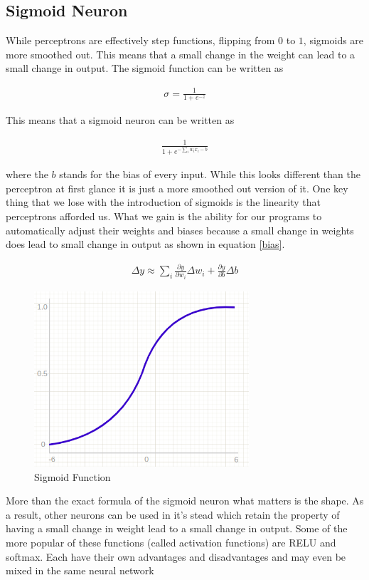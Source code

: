 \subsection{Sigmoid Neuron}

While perceptrons are effectively step functions, flipping from $0$ to $1$, sigmoids are more smoothed out.
This means that a small change in the weight can lead to a small change in output\cite{Nielson_2020}.
The sigmoid function can be written as

\begin{align}
  \sigma = \frac{1}{1 + e^{-z}}
\end{align}

This means that a sigmoid neuron can be written as

\begin{align}
  \frac{1}{1 + e^{-\sum_i w_i x_i - b}}
\end{align}

where the $b$ stands for the bias of every input.
While this looks different than the perceptron at first glance it is just a more smoothed out version of it.
One key thing that we lose with the introduction of sigmoids is the linearity that perceptrons afforded us.
What we gain is the ability for our programs to automatically adjust their weights and biases because a small change in weights does lead to small change in output as shown in equation \ref{bias}.

\begin{align}\label{bias}
  \Delta y \approx \sum_i \frac{\partial y}{\partial w_i}\Delta w_i + \frac{\partial y}{\partial b}\Delta b
\end{align}

\begin{figure}[H]
  \centering
  \includegraphics[width=80mm]{figures/sigmoid.png}
  \caption{Sigmoid Function \cite{Potrimba_2023}}
  \label{network}
\end{figure}

More than the exact formula of the sigmoid neuron what matters is the shape.
As a result, other neurons can be used in it's stead which retain the property of having a small change in weight lead to a small change in output.
Some of the more popular of these functions (called activation functions) are RELU and softmax.
Each have their own advantages and disadvantages and may even be mixed in the same neural network

